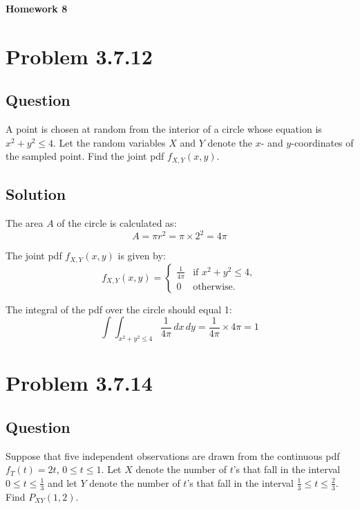 \documentclass[12pt]{article}
\begin{document}
\begin{center}
  \Large \textbf{Homework 8}
\end{center}

\section*{Problem 3.7.12}
\subsection*{Question}
A point is chosen at random from the interior of a circle whose equation is \(x^2 + y^2 \leq 4\). Let the random variables \(X\) and \(Y\) denote the \(x\)- and \(y\)-coordinates of the sampled point. Find the joint pdf \(f_{X,Y}(x, y)\).

\subsection*{Solution}
The area \(A\) of the circle is calculated as:
\[
A = \pi r^2 = \pi \times 2^2 = 4\pi
\]

The joint pdf \(f_{X,Y}(x, y)\) is given by:
\[
f_{X,Y}(x, y) = \begin{cases} 
\frac{1}{4\pi} & \text{if } x^2 + y^2 \leq 4, \\
0 & \text{otherwise}.
\end{cases}
\]

The integral of the pdf over the circle should equal 1:
\[
\int \int_{x^2 + y^2 \leq 4} \frac{1}{4\pi} \, dx \, dy = \frac{1}{4\pi} \times 4\pi = 1
\]

\section*{Problem 3.7.14}
\subsection*{Question}
Suppose that five independent observations are drawn from the continuous pdf \(f_T(t) = 2t\), \(0 \leq t \leq 1\). Let \(X\) denote the number of \(t\)'s that fall in the interval \(0 \leq t \leq \frac{1}{3}\) and let \(Y\) denote the number of \(t\)'s that fall in the interval \(\frac{1}{3} \leq t \leq \frac{2}{3}\). Find \(P_{XY}(1, 2)\).
\end{document}
